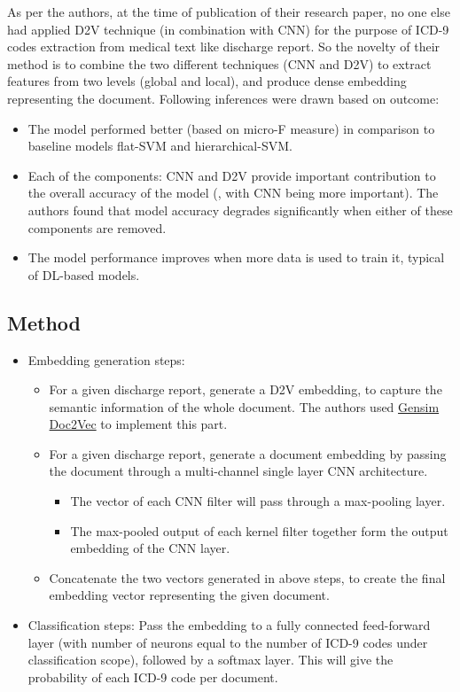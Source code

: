 \documentclass[11pt,a4paper]{article}
\begin{document}
As per the authors, at the time of publication of their research paper, no one else had applied D2V technique (in combination with CNN) for the purpose of ICD-9 codes extraction from medical text like discharge report. So the novelty of their method is to combine the two different techniques (CNN and D2V) to extract features from two levels (global and local), and produce dense embedding representing the document.
Following inferences were drawn based on outcome:
\begin{itemize}
    \item The model performed better (based on micro-F measure) in comparison to baseline models flat-SVM and hierarchical-SVM.
    \item Each of the components: CNN and D2V provide important contribution to the overall accuracy of the model (, with CNN being more important). The authors found that model accuracy degrades significantly when either of these components are removed.
    \item The model performance improves when more data is used to train it, typical of DL-based models.
\end{itemize}
\subsection{Method}
\begin{itemize}
    \item Embedding generation steps:
    		\begin{itemize}
        		\item For a given discharge report, generate a D2V embedding, to capture the semantic information of the whole document. The authors used \href{https://radimrehurek.com/gensim/models/doc2vec.html}{Gensim Doc2Vec} to implement this part.
        		\item For a given discharge report, generate a document embedding by passing the document through a multi-channel single layer CNN architecture. 
        		\begin{itemize}
            		\item The vector of each CNN filter will pass through a max-pooling layer.
            		\item The max-pooled output of each kernel filter together form the output embedding of the CNN layer.
        		\end{itemize}     
        		\item Concatenate the two vectors generated in above steps, to create the final embedding vector representing the given document.
    		\end{itemize}
    \item Classification steps: Pass the embedding to a fully connected feed-forward layer (with number of neurons equal to the number of ICD-9 codes under classification scope), followed by a softmax layer. This will give the probability of each ICD-9 code per document.
\end{itemize}
\end{document}
